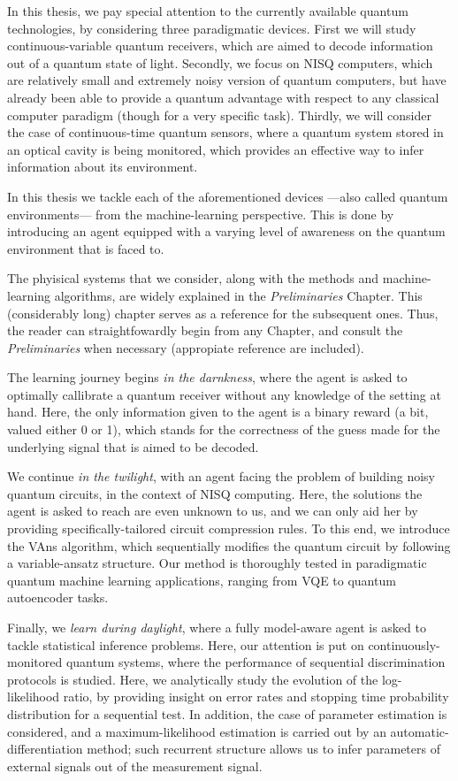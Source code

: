 \bigskip
In this thesis, we pay special attention to the currently available quantum technologies, by considering three paradigmatic devices. First we will study continuous-variable quantum receivers, which are aimed to decode information out of a quantum state of light. Secondly, we focus on NISQ computers, which are relatively small and extremely noisy version of quantum computers, but have already been able to provide a quantum advantage with respect to any classical computer paradigm (though for a very specific task). Thirdly, we will consider the case of continuous-time quantum sensors, where a quantum system stored in an optical cavity is being monitored, which provides an effective way to infer information about its environment.

In this thesis we tackle each of the aforementioned devices ---also called quantum environments--- from the machine-learning perspective. This is done by introducing an agent equipped with a varying level of awareness on the quantum environment that is faced to.

The phyisical systems that we consider, along with the methods and machine-learning algorithms, are
widely explained in the \textit{Preliminaries} Chapter. This (considerably long) chapter serves as a reference for the subsequent ones. Thus, the reader can straightfowardly begin from any Chapter, and consult the \textit{Preliminaries} when necessary (appropiate reference are included).

The learning journey begins \textit{in the darnkness}, where the agent is asked to optimally callibrate a quantum receiver without any knowledge of the setting at hand. Here, the only information given to the agent is a binary reward (a bit, valued either 0 or 1), which stands for the correctness of the guess made for the underlying signal that is aimed to be decoded.

We continue \textit{in the twilight}, with an agent facing the problem of building noisy quantum circuits, in the context of NISQ computing. Here, the solutions the agent is asked to reach are even unknown to us, and we can only aid her by providing specifically-tailored circuit compression rules. To this end, we introduce the VAns algorithm, which sequentially modifies the quantum circuit by following a variable-ansatz structure. Our method is thoroughly tested in paradigmatic quantum machine learning applications, ranging from VQE to quantum autoencoder tasks.

Finally, we \textit{learn during daylight}, where a fully model-aware agent is asked to tackle statistical inference problems. Here, our attention is put on continuously-monitored quantum systems, where the performance of sequential discrimination protocols is studied. Here, we analytically study the evolution of the log-likelihood ratio, by providing insight on error rates and stopping time probability distribution for a sequential test. In addition, the case of parameter estimation is considered, and a maximum-likelihood estimation is carried out by an automatic-differentiation method; such recurrent structure allows us to infer parameters of external signals out of the measurement signal.

